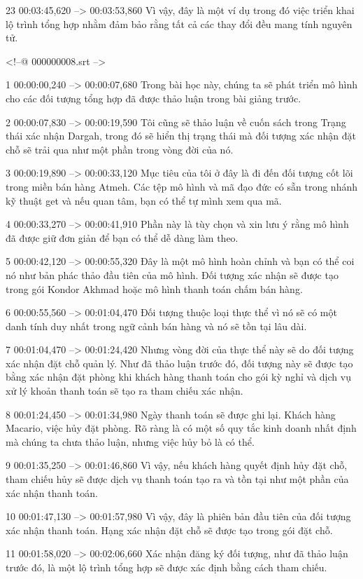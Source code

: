 23
00:03:45,620 --> 00:03:53,860
Vì vậy, đây là một ví dụ trong đó việc triển khai lộ trình tổng hợp nhằm đảm bảo rằng tất cả các thay đổi đều mang tính nguyên tử.

<!--@ 000000008.srt -->

1
00:00:00,240 --> 00:00:07,680
Trong bài học này, chúng ta sẽ phát triển mô hình cho các đối tượng tổng hợp đã được thảo luận trong bài giảng trước.

2
00:00:07,830 --> 00:00:19,590
Tôi cũng sẽ thảo luận về cuốn sách trong Trạng thái xác nhận Dargah, trong đó sẽ hiển thị trạng thái mà đối tượng xác nhận đặt chỗ sẽ trải qua như một phần trong vòng đời của nó.

3
00:00:19,890 --> 00:00:33,120
Mục tiêu của tôi ở đây là đi đến đối tượng cốt lõi trong miền bán hàng Atmeh.  Các tệp mô hình và mã đạo đức có sẵn trong nhánh kỹ thuật get và nếu quan tâm, bạn có thể tự mình xem qua mã.

4
00:00:33,270 --> 00:00:41,910
Phần này là tùy chọn và xin lưu ý rằng mô hình đã được giữ đơn giản để bạn có thể dễ dàng làm theo.

5
00:00:42,120 --> 00:00:55,320
Đây là một mô hình hoàn chỉnh và bạn có thể coi nó như bản phác thảo đầu tiên của mô hình.  Đối tượng xác nhận sẽ được tạo trong gói Kondor Akhmad hoặc mô hình thanh toán chấm bán hàng.

6
00:00:55,560 --> 00:01:04,470
Đối tượng thuộc loại thực thể vì nó sẽ có một danh tính duy nhất trong ngữ cảnh bán hàng và nó sẽ tồn tại lâu dài.

7
00:01:04,470 --> 00:01:24,420
Nhưng vòng đời của thực thể này sẽ do đối tượng xác nhận đặt chỗ quản lý.  Như đã thảo luận trước đó, đối tượng này sẽ được tạo bằng xác nhận đặt phòng khi khách hàng thanh toán cho gói kỳ nghỉ và dịch vụ xử lý khoản thanh toán sẽ tạo ra tham chiếu xác nhận.

8
00:01:24,450 --> 00:01:34,980
Ngày thanh toán sẽ được ghi lại.  Khách hàng Macario, việc hủy đặt phòng.  Rõ ràng là có một số quy tắc kinh doanh nhất định mà chúng ta chưa thảo luận, nhưng việc hủy bỏ là có thể.

9
00:01:35,250 --> 00:01:46,860
Vì vậy, nếu khách hàng quyết định hủy đặt chỗ, tham chiếu hủy sẽ được dịch vụ thanh toán tạo ra và tồn tại như một phần của xác nhận thanh toán.

10
00:01:47,130 --> 00:01:57,980
Vì vậy, đây là phiên bản đầu tiên của đối tượng xác nhận thanh toán.  Hạng xác nhận đặt chỗ sẽ được tạo trong gói đặt chỗ.

11
00:01:58,020 --> 00:02:06,660
Xác nhận đăng ký đối tượng, như đã thảo luận trước đó, là một lộ trình tổng hợp sẽ được xác định bằng cách tham chiếu.

